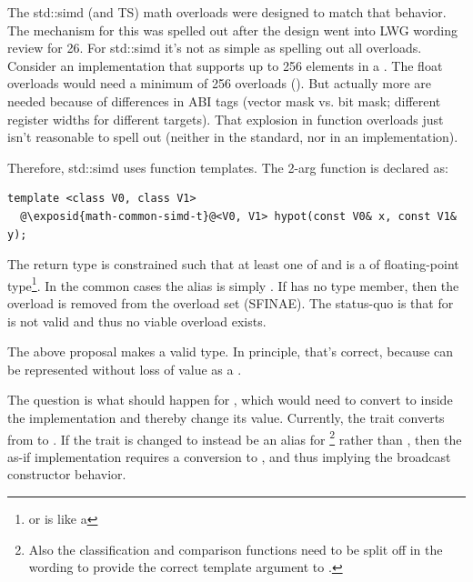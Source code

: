 The std::simd (and TS) math overloads were designed to match that behavior.
The mechanism for this was spelled out after the design went into LWG wording review for \CC{}26.
For std::simd it's not as simple as spelling out all overloads.
Consider an implementation that supports up to 256 elements in a .
The float overloads would need a minimum of 256 overloads ().
But actually more are needed because of differences in ABI tags (vector mask vs. bit mask;
different register widths for different targets).
That explosion in function overloads just isn't reasonable to spell out (neither in the standard,
nor in an implementation).

Therefore, std::simd uses function templates.
The 2-arg  function is declared as:
\medskip\begin{lstlisting}[style=Vc]
template <class V0, class V1>
  @\exposid{math-common-simd-t}@<V0, V1> hypot(const V0& x, const V1& y);
\end{lstlisting}
The return type is constrained such that at least one of  and  is a
 of floating-point type\footnote{or is like a }.
In the common cases the  alias is simply .
If  has no type member, then the overload is removed from the overload set
(SFINAE).
The status-quo is that for 
 is not valid and thus no viable
 overload exists.

The above proposal makes  a valid type.
In principle, that's correct, because  can be represented without loss of value as a
.

The question is what should happen for , which would need
to convert  to  inside the  implementation and thereby
change its value.
Currently, the  trait converts  from  to
.
If the  trait is changed to instead be an alias for
\footnote{Also the classification and comparison functions need to be split off in the
wording to provide the correct template argument to .} rather than
, then the as-if implementation requires a conversion to ,
and thus implying the broadcast constructor behavior.

